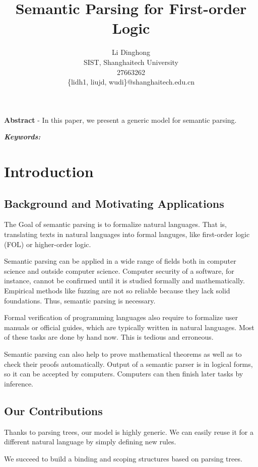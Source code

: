 \documentclass{article}
\title{Semantic Parsing for First-order Logic}
\author{
	Li Dinghong\\
	SIST, Shanghaitech University\\
	27663262\\
	\{lidh1, liujd, wudi\}@shanghaitech.edu.cn
}
\begin{document}
{
	\newpage
	\maketitle

	\textbf{Abstract} - {In this paper, we present a generic model for semantic parsing. }

	\vspace{5pt}
	\textbf{\emph{Keywords:}} {}

	\tableofcontents
}

\section{Introduction}{
	\subsection{Background and Motivating Applications}{
		The Goal of semantic parsing is to formalize natural languages. That is, translating texts in natural languages into formal languges, like first-order logic (FOL) or higher-order logic. 

		Semantic parsing can be applied in a wide range of fields both in computer science and outside computer science. Computer security of a software, for instance, cannot be confirmed until it is studied formally and mathematically. Empirical methods like fuzzing are not so reliable because they lack solid foundations. Thus, semantic parsing is necessary. 

		Formal verification of programming languages also require to formalize user manuals or official guides, which are typically written in natural languages. Most of these tasks are done by hand now. This is tedious and erroneous. 

		Semantic parsing can also help to prove mathematical theorems as well as to check their proofs automatically. Output of a semantic parser is in logical forms, so it can be accepted by computers. Computers can then finish later tasks by inference. 
	}

	\subsection{Our Contributions}{
		Thanks to parsing trees, our model is highly generic. We can easily reuse it for a different natural language by simply defining new rules. 

		We succeed to build a binding and scoping structures based on parsing trees. 
	}
}
\end{document}
